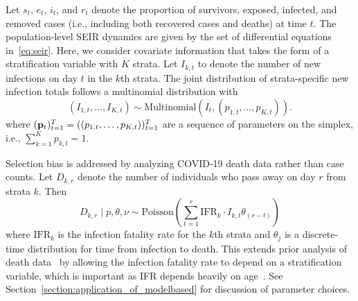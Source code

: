\documentclass[11pt]{amsart}
\numberwithin{equation}{section}
\theoremstyle{plain}
\begin{document}
 Let $s_t$, $e_t$, $i_t$, and $r_t$ denote the proportion of survivors, exposed, infected, and removed cases (i.e., including both recovered cases and deaths) at time $t$.  The population-level SEIR dynamics are given by the set of differential equations in~\eqref{eq:seir}.
Here, we consider covariate information that takes the form of a stratification variable with $K$ strata.  Let $I_{k,t}$ to denote the number of new infections on day $t$ in the $k$th strata.  The joint distribution of strata-specific new infection totals follows a multinomial distribution with
 $$
 ( I_{1,t}, \ldots, I_{K,t} ) \sim \text{Multinomial} \left( I_t, (p_{1,t}, \ldots, p_{K, t}) \right).
 $$
 where $( {\bf p}_t )_{t=1}^T = ( (p_{1,t}, \ldots, p_{K, t}) )_{t=1}^T$ are a sequence of parameters on the simplex, i.e., $\sum_{k=1}^K p_{k,t} = 1$.

 Selection bias is addressed by analyzing COVID-19 death data rather than case counts.  Let $D_{k,r}$ denote the number of individuals who pass away on day $r$ from strata $k$.  Then
 $$
 D_{k,r} \mid p, \theta, \nu \sim \text{Poisson} \left( \sum_{t=1}^r \text{IFR}_{k} \cdot I_{k,t} \theta_{(r-t)} \right)
 $$
 where $\text{IFR}_{k}$ is the infection fatality rate for the $k$th strata and $\theta_{j}$ is a discrete-time distribution for time from infection to death.  This extends prior analysis of death data~\cite{Johndrow2020} by allowing the infection fatality rate to depend on a stratification variable, which is important as IFR depends heavily on age~\citep{Levin2020}. See Section~\ref{section:application_of_modelbased} for discussion of parameter choices.  %

\end{document}
